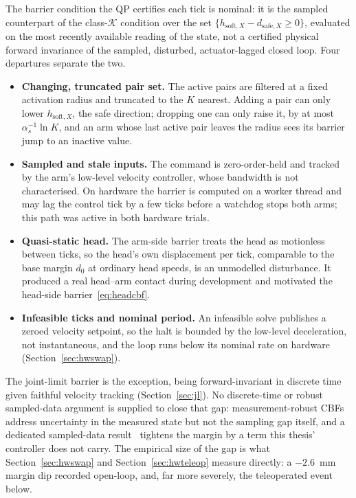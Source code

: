 The barrier condition the QP certifies each tick is nominal: it is the sampled counterpart of the class-$\mathcal{K}$ condition over the set $\{h_{\text{soft},X} - d_{\text{safe},X} \ge 0\}$, evaluated on the most recently available reading of the state, not a certified physical forward invariance of the sampled, disturbed, actuator-lagged closed loop. Four departures separate the two.
\begin{itemize}[nosep]
\item \textbf{Changing, truncated pair set.} The active pairs are filtered at a fixed activation radius and truncated to the $K$ nearest. Adding a pair can only lower $h_{\text{soft},X}$, the safe direction; dropping one can only raise it, by at most $\alpha_s^{-1}\ln K$, and an arm whose last active pair leaves the radius sees its barrier jump to an inactive value.
\item \textbf{Sampled and stale inputs.} The command is zero-order-held and tracked by the arm's low-level velocity controller, whose bandwidth is not characterised. On hardware the barrier is computed on a worker thread and may lag the control tick by a few ticks before a watchdog stops both arms; this path was active in both hardware trials.
\item \textbf{Quasi-static head.} The arm-side barrier treats the head as motionless between ticks, so the head's own displacement per tick, comparable to the base margin $d_0$ at ordinary head speeds, is an unmodelled disturbance. It produced a real head--arm contact during development and motivated the head-side barrier~\eqref{eq:headcbf}.
\item \textbf{Infeasible ticks and nominal period.} An infeasible solve publishes a zeroed velocity setpoint, so the halt is bounded by the low-level deceleration, not instantaneous, and the loop runs below its nominal rate on hardware (Section~\ref{sec:hwswap}).
\end{itemize}
The joint-limit barrier is the exception, being forward-invariant in discrete time given faithful velocity tracking (Section~\ref{sec:jl}). No discrete-time or robust sampled-data argument is supplied to close that gap: measurement-robust CBFs~\cite{cosner2021mrcbf} address uncertainty in the measured state but not the sampling gap itself, and a dedicated sampled-data result~\cite{breeden2021sampled} tightens the margin by a term this thesis' controller does not carry. The empirical size of the gap is what Section~\ref{sec:hwswap} and Section~\ref{sec:hwteleop} measure directly: a $-2.6$~mm margin dip recorded open-loop, and, far more severely, the teleoperated event below.

